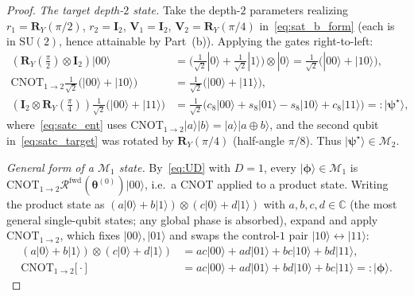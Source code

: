 \documentclass[10pt,a4paper]{amsart}
\newcommand{\CNOT}{\mathrm{CNOT}}
\newcommand{\SU}{\mathrm{SU}}
\newcommand{\bbC}{\mathbb{C}}
\newcommand{\cM}{\mathcal{M}}
\begin{document}
\begin{proof}
\emph{The target depth-$2$ state.} Take the depth-$2$ parameters
realizing $r_1=\mathbf{R}_Y(\pi/2)$, $r_2=\mathbf{I}_2$, $\mathbf{V}_1=\mathbf{I}_2$,
$\mathbf{V}_2=\mathbf{R}_Y(\pi/4)$ in~\eqref{eq:sat_b_form} (each is in $\SU(2)$, hence
attainable by Part~(b)). Applying the gates right-to-left:
\begin{align}
  (\mathbf{R}_Y(\tfrac\pi2)\otimes\mathbf{I}_2)|00\rangle
  &= \bigl(\tfrac{1}{\sqrt2}|0\rangle+\tfrac{1}{\sqrt2}|1\rangle\bigr)
     \otimes|0\rangle
   = \tfrac{1}{\sqrt2}\bigl(|00\rangle+|10\rangle\bigr),
     \label{eq:satc_pre}\\
  \CNOT_{1\to2} \tfrac{1}{\sqrt2}\bigl(|00\rangle+|10\rangle\bigr)
  &= \tfrac{1}{\sqrt2}\bigl(|00\rangle+|11\rangle\bigr),
     \label{eq:satc_ent}\\
  (\mathbf{I}_2\otimes\mathbf{R}_Y(\tfrac\pi4)) 
     \tfrac{1}{\sqrt2}\bigl(|00\rangle+|11\rangle\bigr)
  &= \tfrac{1}{\sqrt2}\bigl(c_8|00\rangle+s_8|01\rangle
     -s_8|10\rangle+c_8|11\rangle\bigr)
   =: |\boldsymbol{\psi}^\star\rangle,
     \label{eq:satc_target}
\end{align}
where~\eqref{eq:satc_ent} uses
$\CNOT_{1\to2}|a\rangle|b\rangle=|a\rangle|a\oplus b\rangle$, and the
second qubit in~\eqref{eq:satc_target} was rotated by
$\mathbf{R}_Y(\pi/4)$ (half-angle $\pi/8$). Thus
$|\boldsymbol{\psi}^\star\rangle\in\cM_2$.

\emph{General form of a $\cM_1$ state.} By~\eqref{eq:UD} with $D=1$,
every $|\boldsymbol{\phi}\rangle\in\cM_1$ is
$\CNOT_{1\to2} \mathcal{R}^{\mathrm{fwd}}(\bm\theta^{(0)})|00\rangle$,
i.e.\ a CNOT applied to a product state. Writing the product state as
$(a|0\rangle+b|1\rangle)\otimes(c|0\rangle+d|1\rangle)$ with
$a,b,c,d\in\bbC$ (the most general single-qubit states; any global
phase is absorbed), expand and apply $\CNOT_{1\to2}$, which fixes
$|00\rangle,|01\rangle$ and swaps the control-$1$ pair
$|10\rangle\leftrightarrow|11\rangle$:
\begin{align}
  (a|0\rangle{+}b|1\rangle)\otimes(c|0\rangle{+}d|1\rangle)
  &= ac |00\rangle+ad |01\rangle+bc |10\rangle+bd |11\rangle,
     \label{eq:satc_prod}\\
  \CNOT_{1\to2}\bigl[ \cdot \bigr]
  &= ac |00\rangle+ad |01\rangle+bd |10\rangle+bc |11\rangle
   =: |\boldsymbol{\phi}\rangle.
     \label{eq:satc_phi}
\end{align}


\end{proof}
\end{document}

